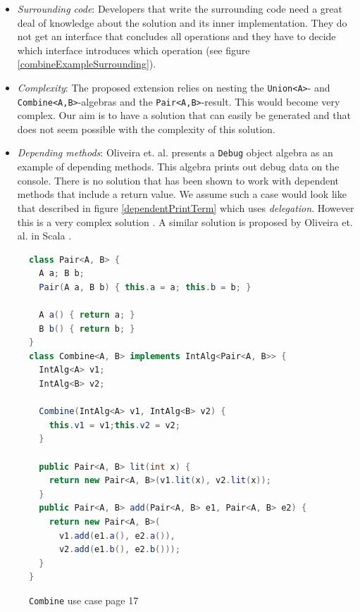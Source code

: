 \documentclass{report}
\begin{document}
\begin{itemize}
  \item \emph{Surrounding code}: Developers that write the surrounding code need a great deal of knowledge about the solution and its inner implementation. They do not get an interface that concludes all operations and they have to decide which interface introduces which operation (see figure \ref{combineExampleSurrounding}).
  \item \emph{Complexity}: The proposed extension relies on nesting the \lstinline{Union<A>}- and \lstinline{Combine<A,B>}-algebras and the \lstinline{Pair<A,B>}-result. This would become very complex. Our aim is to have a solution that can easily be generated and that does not seem possible with the complexity of this solution.
  \item \emph{Depending methods}: Oliveira et. al. presents a \lstinline{Debug} object algebra as an example of depending methods. This algebra prints out debug data on the console. There is no solution that has been shown to work with dependent methods that include a return value. We assume such a case would look like that described in figure \ref{dependentPrintTerm} which uses \emph{delegation}. However this is a very complex solution \cite{Tempero-Multiple-2000}. A similar solution is proposed by Oliveira et. al. in Scala \cite{Oliv-Feature-2013}.
\end{itemize}

\begin{figure}[H]
\begin{lstlisting}[language=java]
class Pair<A, B> {
  A a; B b;
  Pair(A a, B b) { this.a = a; this.b = b; }

  A a() { return a; }
  B b() { return b; }
}
class Combine<A, B> implements IntAlg<Pair<A, B>> {
  IntAlg<A> v1;
  IntAlg<B> v2;

  Combine(IntAlg<A> v1, IntAlg<B> v2) {
    this.v1 = v1;this.v2 = v2;
  }
  
  public Pair<A, B> lit(int x) {
    return new Pair<A, B>(v1.lit(x), v2.lit(x));
  }
  public Pair<A, B> add(Pair<A, B> e1, Pair<A, B> e2) {
    return new Pair<A, B>(
      v1.add(e1.a(), e2.a()),
      v2.add(e1.b(), e2.b()));
  }
}
\end{lstlisting}
\caption{\lstinline{Combine} use case \cite{Oliv-Extensibility-2012} page 17}
\label{combineExampleOliv}
\end{figure}
\end{document}
